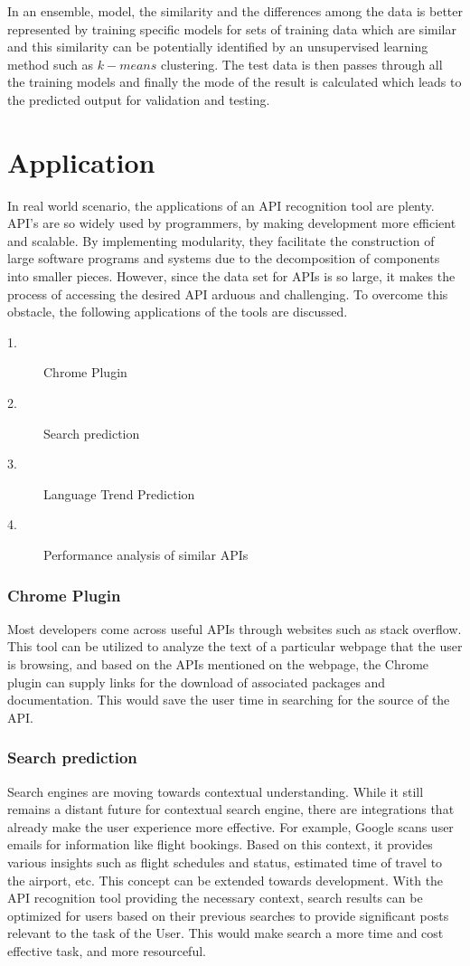 \documentclass{sig-alternate-05-2015}
\begin{document}
In an ensemble, model, the similarity and the differences among the data is better represented by training specific models for sets of training data which are similar and this similarity can be potentially identified by an unsupervised learning method such as $k-means$ clustering. The test data is then passes through all the training models and finally the mode of the result is calculated which leads to the predicted output for validation and testing.

\section{Application}
In real world scenario, the applications of an API recognition tool are plenty. API’s are so widely used by programmers, by making development more efficient and scalable. By implementing modularity, they facilitate the construction of large software programs and systems due to the decomposition of components into smaller pieces. However, since the data set for APIs is so large, it makes the process of accessing the desired API arduous and challenging. To overcome this obstacle, the following applications of the tools are discussed. 

\begin{description}
\item[1.]Chrome Plugin
\item[2.]Search prediction
\item[3.]Language Trend Prediction
\item[4.]Performance analysis of similar APIs
\end{description}

\subsubsection{Chrome Plugin}
Most developers come across useful APIs through websites such as stack overflow. This tool can be utilized to analyze the text of a particular webpage that the user is browsing, and based on the APIs mentioned on the webpage, the Chrome plugin can supply links for the download of associated packages and documentation. This would save the user time in searching for the source of the API. 

\subsubsection{Search prediction}
Search engines are moving towards contextual understanding. While it still remains a distant future for contextual search engine, there are integrations that already make the user experience more effective. For example, Google scans user emails for information like flight bookings. Based on this context, it provides various insights such as flight schedules and status, estimated time of travel to the airport, etc. This concept can be extended towards development. With the API recognition tool providing the necessary context, search results can be optimized for users based on their previous searches to provide significant posts relevant to the task of the User. This would make search a more time and cost effective task, and more resourceful.
\end{document}
